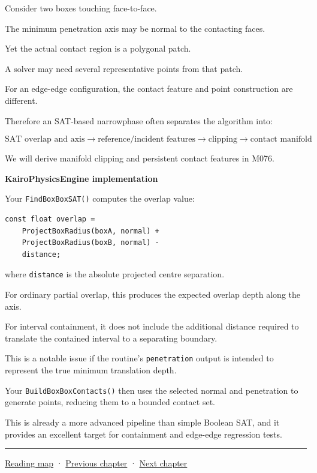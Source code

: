 Consider two boxes touching face-to-face.

The minimum penetration axis may be normal to the contacting faces.

Yet the actual contact region is a polygonal patch.

A solver may need several representative points from that patch.

For an edge-edge configuration, the contact feature and point construction are different.

Therefore an SAT-based narrowphase often separates the algorithm into:

\[
\boxed{ \text{SAT overlap and axis} \rightarrow \text{reference/incident features} \rightarrow \text{clipping} \rightarrow \text{contact manifold} }
\]

We will derive manifold clipping and persistent contact features in M076.

\textbf{KairoPhysicsEngine implementation}

Your \texttt{FindBoxBoxSAT()} computes the overlap value:

\begin{verbatim}
const float overlap =
    ProjectBoxRadius(boxA, normal) +
    ProjectBoxRadius(boxB, normal) -
    distance;
\end{verbatim}

where \texttt{distance} is the absolute projected centre separation.

For ordinary partial overlap, this produces the expected overlap depth along the axis.

For interval containment, it does not include the additional distance required to translate the contained interval to a separating boundary.

This is a notable issue if the routine's \texttt{penetration} output is intended to represent the true minimum translation depth.

Your \texttt{BuildBoxBoxContacts()} then uses the selected normal and penetration to generate points, reducing them to a bounded contact set.

This is already a more advanced pipeline than simple Boolean SAT, and it provides an excellent target for containment and edge-edge regression tests.

\begin{center}\rule{0.5\linewidth}{0.5pt}\end{center}

\href{Chapter\%20Edition/02\%20-\%20Graphics\%20Vision\%20and\%20XR/00\%20-\%20Reading\%20Map}{Reading map} · \hyperref[04-visual-computing-ii-ch023]{Previous chapter} · \hyperref[04-visual-computing-ii-ch025]{Next chapter}
